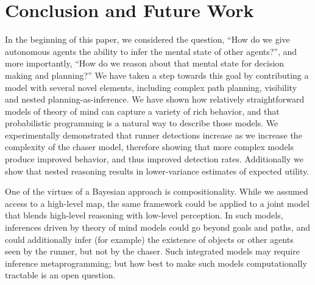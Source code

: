 \documentclass[twoside]{article}
\begin{document}
\vskip -0.1in
\section{Conclusion and Future Work}
\vskip -0.1in

In the beginning of this paper, we considered the question, ``How do we give autonomous agents the ability to infer the mental state of other agents?'', and more importantly, ``How do we reason about that mental state for decision making and planning?'' 
We have taken a step towards this goal by contributing a model with several novel elements, including complex path planning, visibility and nested planning-as-inference.
We %
have shown how relatively straightforward models of theory of mind can capture a variety of rich behavior, and that probabilistic programming is a natural way to describe those models. 
We experimentally demonstrated that runner detections increase as we increase the complexity of the chaser model, therefore showing that more complex models produce improved behavior, and thus improved detection rates. Additionally we show that nested reasoning results in lower-variance estimates of expected utility.

One of the virtues of a Bayesian approach is compositionality.  While
we assumed access to a high-level map, the same framework could be
applied to a joint model that blends high-level reasoning with
low-level perception.  In such models, inferences driven by theory of
mind models could go beyond goals and paths, and could additionally
infer (for example) the existence of objects or other agents seen by
the runner, but not by the chaser.  Such integrated models may
require inference metaprogramming; but how best to make
such models computationally tractable is an open question.



%
%
\printbibliography
\end{document}
